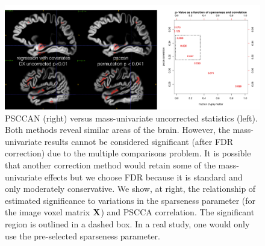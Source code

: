 \documentclass{llncs}
\newcommand{\X}{{\bf X}}
\begin{document}
\begin{figure}
\begin{center}
\includegraphics[width=120mm]{MUvPSCCAN.pdf} 
\end{center}
\vspace{-0.1in}
\caption{PSCCAN (right) versus mass-univariate uncorrected statistics
(left).  Both methods reveal similar areas of the brain.  However, the
mass-univariate results cannot be considered significant (after FDR
correction) due to the multiple comparisons problem.  It is possible
that another correction method would retain some of the mass-univariate
effects but we choose FDR because it is standard and only moderately
conservative.  We show, at right, the relationship of estimated
significance to variations in the sparseness parameter (for the image
voxel matrix $\X$) and PSCCA correlation.  The significant region is
outlined in a dashed box.  In a real study, one would only use the
pre-selected sparseness parameter.}
\label{fig:comp}
\end{figure}
\vspace{-0.1in}
\end{document}

